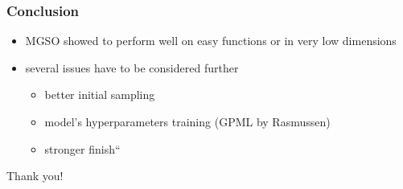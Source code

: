 \documentclass[sans,mathserif]{beamer}
\newcommand{\uv}[1]{\quotedblbase #1\textquotedblleft}
\begin{document}
\begin{frame}
  \frametitle{Conclusion}
  \begin{itemize}
    \item MGSO showed to perform well on easy functions or in very low dimensions
    \item several issues have to be considered further
      \begin{itemize}
        \item better initial sampling
        \item model's hyperparameters training (GPML by Rasmussen)
        \item \uv{stronger finish}
      \end{itemize}
  \end{itemize}
\end{frame}

\begin{frame}
  \begin{center}
    {\Large Thank you! }
  \end{center}
\end{frame}
\end{document}
